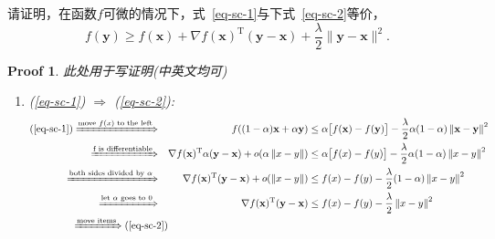 \documentclass[a4paper,UTF8]{article}
\newcommand{\norm}[1]{\left\lVert#1\right\rVert}
\numberwithin{equation}{section}
\newtheorem*{myProof}{Proof}
\begin{document}
请证明，在函数$f$可微的情况下，式~\eqref{eq-sc-1}与下式~\eqref{eq-sc-2}等价，
\begin{equation}
  \label{eq-sc-2}
  f(\mathbf{y}) \geq f(\mathbf{x}) + \nabla f(\mathbf{x})^\mathrm{T}(\mathbf{y}-\mathbf{x}) + \frac{\lambda}{2}\lVert \mathbf{y} - \mathbf{x}\rVert^2.
\end{equation}
\begin{myProof}
此处用于写证明(中英文均可)
\begin{enumerate}[(1)]
\item (\ref{eq-sc-1}) $\Rightarrow$ (\ref{eq-sc-2}): \\

\begin{equation*}
\begin{alignedat}{2}
(\ref{eq-sc-1}) \xRightarrow{\text{move }f(x) \text{ to the left}}  \quad &&
   f((1-\alpha)\mathbf{x} + \alpha\mathbf{y})                &\leq \alpha \big[ f(\mathbf{x})-f(\mathbf{y})\big] - \frac{\lambda}{2}\alpha(1-\alpha) \norm{\mathbf{x}-\mathbf{y}}^2
   \\
\xRightarrow{\text{f is differentiable}} \quad &&
 \nabla f(\mathbf{x})^\mathrm{T}\alpha (\mathbf{y}-\mathbf{x}) + o(\alpha\norm{x-y}) & \leq \alpha \big[ f(x)-f(y)\big] - \frac{\lambda}{2}\alpha(1-\alpha) \norm{x-y}^2
\\
\xRightarrow{\text{both sides divided by } \alpha} \quad &&
 \nabla f(\mathbf{x})^\mathrm{T} (\mathbf{y}-\mathbf{x})+o(\norm{x-y})  & \leq  f(x)-f(y) - \frac{\lambda}{2}(1-\alpha) \norm{x-y}^2
\\
 \xRightarrow{\text{let } \alpha \text{ goes to }0} \quad &&
 \nabla f(\mathbf{x})^\mathrm{T} (\mathbf{y}-\mathbf{x})  & \leq  f(x)-f(y) - \frac{\lambda}{2} \norm{x-y}^2 \\
 \xRightarrow{\text{move items}} (\ref{eq-sc-2}) && \quad & \quad
\end{alignedat}
\end{equation*}


\end{enumerate}
\end{myProof}
\end{document}
